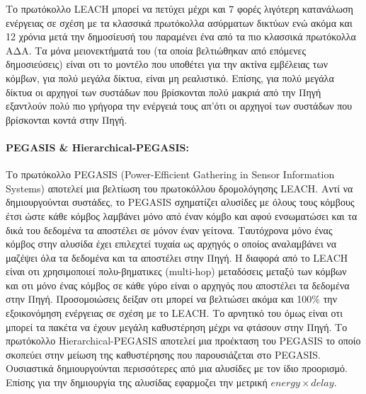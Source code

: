 Το πρωτόκολλο LEACH μπορεί να πετύχει μέχρι και 7 φορές λιγότερη κατανάλωση ενέργειας σε σχέση με τα κλασσικά πρωτόκολλα ασύρματων δικτύων \cite{leach_protocol} ενώ
ακόμα και 12 χρόνια μετά την δημοσίευσή του παραμένει ένα από τα πιο κλασσικά πρωτόκολλα ΑΔΑ. Τα μόνα μειονεκτήματά του (τα οποία βελτιώθηκαν από επόμενες
δημοσιεύσεις) είναι οτι το μοντέλο που υποθέτει για την ακτίνα εμβέλειας των κόμβων, για πολύ μεγάλα δίκτυα, είναι μη ρεαλιστικό. Επίσης, για πολύ μεγάλα δίκτυα οι
αρχηγοί των συστάδων που βρίσκονται πολύ μακριά από την Πηγή εξαντλούν πολύ πιο γρήγορα την ενέργειά τους απ'ότι οι αρχηγοί των συστάδων που βρίσκονται κοντά στην
Πηγή.

\paragraph{PEGASIS \& Hierarchical-PEGASIS:} Το πρωτόκολλο PEGASIS (Power-Efficient Gathering in Sensor Information Systems) \cite{pegasis_protocol} αποτελεί μια
βελτίωση του πρωτοκόλλου δρομολόγησης LEACH. Αντί να δημιουργούνται συστάδες, το PEGASIS σχηματίζει αλυσίδες με όλους τους κόμβους έτσι ώστε κάθε κόμβος λαμβάνει μόνο
από έναν κόμβο και αφού ενσωματώσει και τα δικά του δεδομένα τα αποστέλει σε μόνον έναν γείτονα. Ταυτόχρονα μόνο ένας κόμβος στην αλυσίδα έχει επιλεχτεί τυχαία ως
αρχηγός ο οποίος αναλαμβάνει να μαζέψει όλα τα δεδομένα και τα αποστέλει στην Πηγή. Η διαφορά από το LEACH είναι οτι χρησιμοποιεί πολυ-βηματικες (multi-hop)
μεταδόσεις μεταξύ των κόμβων και οτι μόνο ένας κόμβος σε κάθε γύρο είναι ο αρχηγός που αποστέλει τα δεδομένα στην Πηγή. Προσομοιώσεις δείξαν οτι μπορεί να βελτιώσει
ακόμα και 100\% την εξοικονόμηση ενέργειας σε σχέση με το LEACH. Το αρνητικό του όμως είναι οτι μπορεί τα πακέτα να έχουν μεγάλη καθυστέρηση μέχρι να φτάσουν στην
Πηγή. Το πρωτόκολλο Hierarchical-PEGASIS \cite{hierarchical_pegasis} αποτελεί μια προέκταση του PEGASIS το οποίο σκοπεύει στην μείωση της καθυστέρησης που
παρουσιάζεται στο PEGASIS. Ουσιαστικά δημιουργούνται περισσότερες από μια αλυσίδες με τον ίδιο προορισμό. Επίσης για την δημιουργία της αλυσίδας εφαρμοζει την μετρική
$energy\times delay$.

